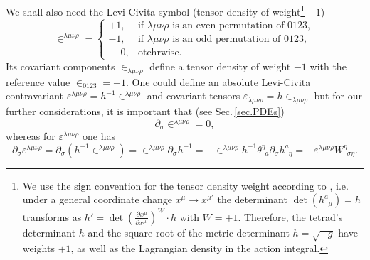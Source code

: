 \documentclass[
10pt, %
a4paper, %
oneside, %
headinclude,footinclude, %
BCOR5mm, %
]{scrartcl}
\newcommand{\pd}[1]{\partial_{#1}}
\newcommand{\tetrsymbol}{h}
\newcommand{\itetrsymbol}{\theta}
\newcommand{\itetr}[2]{\itetrsymbol^{#1}_{\phantom{#1}#2}}
\newcommand{\tetr}[2]{\tetrsymbol^{#1}_{\phantom{#1}#2}}
\newcommand{\detTetr}{\tetrsymbol}
\newcommand{\D}[1]{\partial_{#1}} %
\newcommand{\w}[2]{W^{#1}_{\phantom{#1}#2}}
\newcommand{\LCsymb}{\bm{\in}}    %
\newcommand{\LCtens}{\varepsilon} %
\begin{document}

We shall also need the Levi-Civita symbol (tensor-density of weight\footnote{We 
	use the 
	sign convention for the tensor density weight according to \cite{Ryder2009,Grinfeld2013}, i.e.
	under a 
	general 
	coordinate change $ x^\mu \to x^{\mu'} $ the determinant $ \det(\tetr{a}{\mu}) = \detTetr $ 
	transforms as $ \detTetr' = \det \left(\frac{\partial x^\mu}{\partial x^{\mu'}} \right)^W 
	\cdot \detTetr $ with $ W=+1 $. Therefore, the tetrad's determinant $ \detTetr $ and the 
	square root of the metric determinant $ \detTetr = \sqrt{-g} $ have weights $ +1 $, as well as 
	the Lagrangian density in the action integral.} $ +1 $)
\begin{equation}\label{eqn.LCsymbol.def}
	\LCsymb^{\lambda\mu\nu\rho} = 
	\left\{ 
	\begin{array}{ll}
	 +1,	& \text{if \ }\lambda\mu\nu\rho \text{ is an even permutation of } 0123,\\[2mm]
     -1,	& \text{if \ }\lambda\mu\nu\rho \text{ is an odd \ permutation of } 0123,\\[2mm]
	  \phantom{-}0,	& \text{otehrwise}.
	\end{array}
	\right.
\end{equation}
Its covariant components $ \LCsymb_{\lambda\mu\nu\rho} $ define a tensor density of weight $ -1 $ 
with the reference value $ \LCsymb_{0123} = -1 $. One could define an absolute 
Levi-Civita 
contravariant $ \LCtens^{\lambda\mu\nu\rho} = h^{-1} \LCsymb^{\lambda\mu\nu\rho} $ 
and covariant tensors $ \LCtens_{\lambda\mu\nu\rho} = h \LCsymb_{\lambda\mu\nu\rho} $ 
but for our further considerations, it is important that 
(see Sec.\,\ref{sec.PDEs})
\begin{equation}\label{eqn.diff.LCsymb}
\D{\sigma}\LCsymb^{\lambda\mu\nu\rho} = 0,
\end{equation}
whereas for $ \LCtens^{\lambda\mu\nu\rho} $ one has
\begin{equation}\label{eqn.diff.LeviCivita}
\D{\sigma}\LCtens^{\lambda\mu\nu\rho} = 
\pd{\sigma}(\detTetr^{-1}\LCsymb^{\lambda\mu\nu\rho}) = 
\LCsymb^{\lambda\mu\nu\rho}\pd{\sigma}\detTetr^{-1} = 
-\LCsymb^{\lambda\mu\nu\rho}\detTetr^{-1}\itetr{\eta}{a}\pd{\sigma}\tetr{a}{\eta} = 
-\LCtens^{\lambda\mu\nu\rho}\w{\eta}{\sigma\eta}. 
\end{equation}
\end{document}
